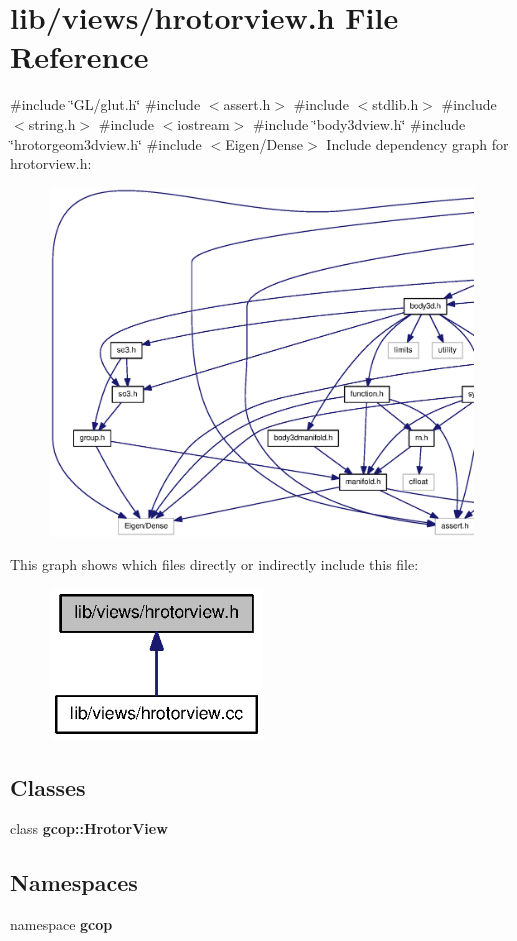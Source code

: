 \section{lib/views/hrotorview.h \-File \-Reference}
\label{hrotorview_8h}
{\ttfamily \#include \char`\"{}\-G\-L/glut.\-h\char`\"{}}\*
{\ttfamily \#include $<$assert.\-h$>$}\*
{\ttfamily \#include $<$stdlib.\-h$>$}\*
{\ttfamily \#include $<$string.\-h$>$}\*
{\ttfamily \#include $<$iostream$>$}\*
{\ttfamily \#include \char`\"{}body3dview.\-h\char`\"{}}\*
{\ttfamily \#include \char`\"{}hrotorgeom3dview.\-h\char`\"{}}\*
{\ttfamily \#include $<$\-Eigen/\-Dense$>$}\*
\-Include dependency graph for hrotorview.\-h\-:\nopagebreak
\begin{figure}[H]
\begin{center}
\leavevmode
\includegraphics[width=350pt]{hrotorview_8h__incl}
\end{center}
\end{figure}
\-This graph shows which files directly or indirectly include this file\-:\nopagebreak
\begin{figure}[H]
\begin{center}
\leavevmode
\includegraphics[width=160pt]{hrotorview_8h__dep__incl}
\end{center}
\end{figure}
\subsection*{\-Classes}
\begin{DoxyCompactItemize}
\item 
class {\bf gcop\-::\-Hrotor\-View}
\end{DoxyCompactItemize}
\subsection*{\-Namespaces}
\begin{DoxyCompactItemize}
\item 
namespace {\bf gcop}
\end{DoxyCompactItemize}
